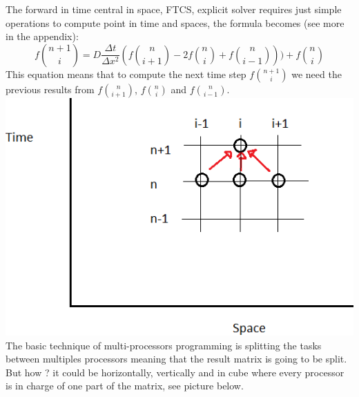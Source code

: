 \documentclass[12pt, a4paper]{report}
\begin{document}
The forward in time central in space, FTCS, explicit solver requires just simple operations to compute point in time and spaces, the formula becomes (see more in the appendix):\begin{equation}f\binom{n+1}{i} = D\frac{\Delta t}{\Delta x^{2}}(f\binom{n}{i+1}-2f\binom{n}{i}+f\binom{n}{i-1}))+f\binom{n}{i}
\end{equation} 
This equation means that to compute the next time step $f\binom{n+1}{i}$ we need the previous results from $f\binom{n}{i+1}$, $f\binom{n}{i}$ and $f\binom{n}{i-1}$.\\
\includegraphics[scale=0.4]{report/stencil.png}\\
The basic technique of multi-processors programming is splitting the tasks between multiples processors meaning that the result matrix is going to be split. But how ? it could be horizontally, vertically and in cube where every processor is in charge of one part of the matrix, see picture below.\\
\end{document}
